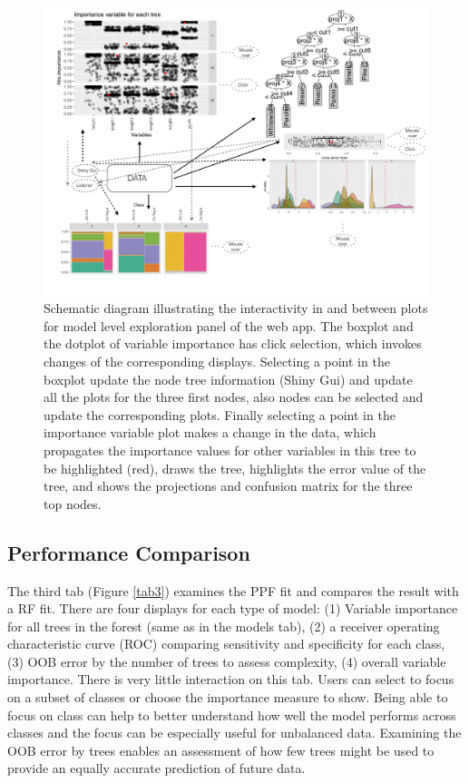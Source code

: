 \documentclass[smallextended,natbib]{svjour3}\usepackage[]{graphicx}\usepackage[]{xcolor}
\begin{document}
\begin{figure}[hbpt]
\centering
\includegraphics[width=1\linewidth]{fishT2.pdf}
\caption{Schematic diagram illustrating the interactivity in and between plots for model level exploration panel of the web app. The boxplot and the dotplot of variable importance has click selection, which invokes changes of the corresponding displays. Selecting a point in the boxplot update the node tree information (Shiny Gui) and update all the plots for the three first nodes, also nodes can be selected and update the corresponding plots. Finally selecting a point in the importance variable plot makes a change in the data, which propagates the importance values for other variables in this tree to be highlighted (red), draws the tree, highlights the error value of the tree, and shows the projections and confusion matrix for the three top nodes.}
\label{tab2diag}
\end{figure}
\newpage

\subsection{Performance Comparison}
The third tab (Figure \ref{tab3}) examines the PPF fit and compares the result with a RF fit. There are four displays for each type of model: (1) Variable importance for all trees in the forest (same as in the models tab), (2) a receiver operating characteristic curve (ROC) comparing sensitivity and specificity for each class, (3) OOB error by the number of trees to assess complexity, (4) overall variable importance. There is very little interaction on this tab. Users can select to focus on a subset of classes or choose the importance measure to show. Being able to focus on class can help to better understand how well the model performs across classes and the focus can be especially useful for unbalanced data. Examining the OOB error by trees enables an assessment of how few trees might be used to provide an equally accurate prediction of future data.
\end{document}
